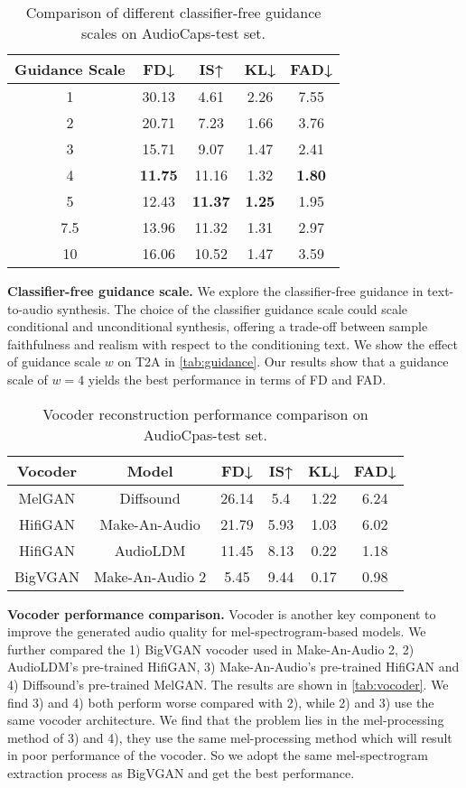 \documentclass{article}
\begin{document}
\begin{table}[!h]\centering
\small
\caption{Comparison of different classifier-free guidance scales on AudioCaps-test set.}
\label{tab:guidance}\begin{tabular}{ccccc}
\toprule
Guidance Scale & FD↓    & IS↑    & KL↓    & FAD↓ \\
\midrule
1      & 30.13  & 4.61   & 2.26   & 7.55 \\
2      & 20.71  & 7.23   & 1.66   & 3.76 \\
3      & 15.71  & 9.07   & 1.47   & 2.41 \\
4      & \textbf{11.75}  & 11.16  & 1.32   & \textbf{1.80} \\
5      & 12.43  & \textbf{11.37}  & \textbf{1.25}   & 1.95 \\
7.5    & 13.96  & 11.32  & 1.31   & 2.97 \\
10     & 16.06  & 10.52  & 1.47   & 3.59 \\
\bottomrule
\end{tabular}\end{table}

\textbf{Classifier-free guidance scale.}
We explore the classifier-free guidance in text-to-audio synthesis. The choice of the classifier guidance scale could scale conditional and unconditional synthesis, offering a trade-off between sample faithfulness and realism with respect to the conditioning text. We show the effect of guidance scale $w$ on T2A in \autoref{tab:guidance}. Our results show that a guidance scale of $w=4$ yields the best performance in terms of FD and FAD.


\begin{table}[!h]
\centering
\small
\caption{Vocoder reconstruction performance comparison on AudioCpas-test set. }
\begin{tabular}{cccccc}
\toprule
  Vocoder  & Model    & FD↓    & IS↑    & KL↓    & FAD↓ \\
\midrule
MelGAN  &  Diffsound & 26.14  & 5.4    & 1.22   & 6.24 \\
HifiGAN  &  Make-An-Audio & 21.79  & 5.93   & 1.03   & 6.02 \\
HifiGAN  &  AudioLDM & 11.45  & 8.13   & 0.22   & 1.18 \\
BigVGAN & Make-An-Audio 2 & 5.45   & 9.44   & 0.17   & 0.98 \\
\bottomrule
\end{tabular}\label{tab:vocoder}
\end{table}


\textbf{Vocoder performance comparison.}
\label{vocoder_comp}
Vocoder is another key component to improve the generated audio quality for mel-spectrogram-based models. We further compared the 1) BigVGAN vocoder used in Make-An-Audio 2, 2) AudioLDM's pre-trained HifiGAN, 3) Make-An-Audio's pre-trained HifiGAN and 4) Diffsound's pre-trained MelGAN. The results are shown in \autoref{tab:vocoder}. We find 3) and 4) both perform worse compared with 2), while 2) and 3) use the same vocoder architecture. We find that the problem lies in the mel-processing method of 3) and 4), they use the same mel-processing method which will result in poor performance of the vocoder. So we adopt the same mel-spectrogram extraction process as BigVGAN and get the best performance.
\end{document}
